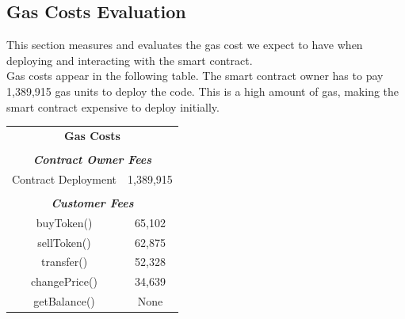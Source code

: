 \documentclass[12pt,a4paper]{article}
\begin{document}
\subsection*{Gas Costs Evaluation}
This section measures and evaluates the gas cost we expect to have when deploying and
interacting with the smart contract. \\

Gas costs appear in the following table. The smart contract owner has to pay
1,389,915 gas units to deploy the code. This is a high amount of gas, making the
smart contract expensive to deploy initially. \\

\begin{table}[htpb]
    \begin{center}
        \begin{tabular}{cc}
        \multicolumn{2}{c}{\textbf{Gas Costs}}                                                                \\
        \multicolumn{1}{l}{}                                                & \multicolumn{1}{l}{}            \\ \hline
        \multicolumn{2}{|c|}{\textit{\textbf{Contract Owner Fees}}}                                           \\ \hline
        \multicolumn{1}{|c|}{Contract Deployment}                           & \multicolumn{1}{c|}{1,389,915}  \\ \hline
        \multicolumn{1}{l}{}                                                & \multicolumn{1}{l}{}            \\ \hline
        \multicolumn{2}{|c|}{\textit{\textbf{Customer Fees}}}                                                 \\ \hline
        \multicolumn{1}{|c|}{buyToken()}                                   & \multicolumn{1}{c|}{65,102}   \\ \hline
        \multicolumn{1}{|c|}{sellToken()}                                  & \multicolumn{1}{c|}{62,875}   \\ \hline
        \multicolumn{1}{|c|}{transfer()}                                   & \multicolumn{1}{c|}{52,328}   \\ \hline
        \multicolumn{1}{|c|}{changePrice()}                                & \multicolumn{1}{c|}{34,639}   \\ \hline
        \multicolumn{1}{|c|}{getBalance()}                                 & \multicolumn{1}{c|}{None}   \\ \hline

\end{tabular}
\end{center}
\end{table}
\end{document}
